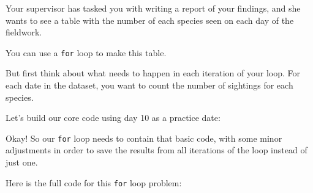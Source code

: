 \documentclass[
]{book}
\newenvironment{Shaded}{\begin{snugshade}}{\end{snugshade}}
\newcommand{\CommentTok}[1]{\textcolor[rgb]{0.56,0.35,0.01}{\textit{#1}}}
\newcommand{\DecValTok}[1]{\textcolor[rgb]{0.00,0.00,0.81}{#1}}
\newcommand{\FunctionTok}[1]{\textcolor[rgb]{0.00,0.00,0.00}{#1}}
\newcommand{\NormalTok}[1]{#1}
\newcommand{\OtherTok}[1]{\textcolor[rgb]{0.56,0.35,0.01}{#1}}
\newcommand{\SpecialCharTok}[1]{\textcolor[rgb]{0.00,0.00,0.00}{#1}}
\newcommand{\StringTok}[1]{\textcolor[rgb]{0.31,0.60,0.02}{#1}}
\begin{document}
Your supervisor has tasked you with writing a report of your findings, and she wants to see a table with the number of each species seen on each day of the fieldwork.

You can use a \texttt{for} loop to make this table.

But first think about what needs to happen in each iteration of your loop. For each date in the dataset, you want to count the number of sightings for each species.

Let's build our core code using day 10 as a practice date:

\begin{Shaded}
\end{Shaded}

Okay! So our \texttt{for} loop needs to contain that basic code, with some minor adjustments in order to save the results from all iterations of the loop instead of just one.

Here is the full code for this \texttt{for} loop problem:
\end{document}

